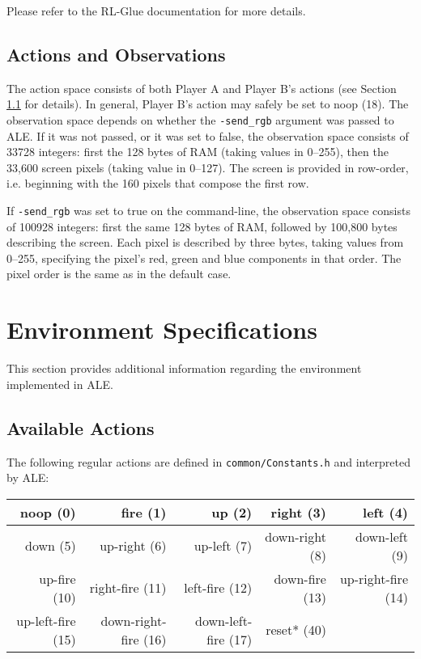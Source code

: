 \documentclass[12pt]{article}
\begin{document}
Please refer to the RL-Glue documentation for more details. 


\subsection{Actions and Observations}

The action space consists of both Player A and Player B's actions (see Section 
\ref{sec:available_actions}
for details). In general, Player B's action may safely be set to noop (18). The observation
space depends on whether the \verb+-send_rgb+ argument was passed to ALE. If it was not passed, 
or it was set to false, the observation space consists of 33728 integers: first the 128 bytes 
of RAM (taking values in 0--255), then the 33,600 screen pixels (taking value in 0--127). The 
screen is provided in row-order, i.e. beginning with the 160 pixels that compose the first row.

 If \verb+-send_rgb+ was set to true on the command-line, the observation space consists of 100928 
 integers: first the same 128 bytes of RAM, followed by 100,800 bytes describing the screen.
 Each pixel is described by three bytes, taking values from 0--255, specifying the pixel's 
 red, green and blue components in that order. The pixel order is the same as in the default
 case.

\section{Environment Specifications}\label{sec:environment_specifications}

This section provides additional information regarding the environment implemented in ALE.

\subsection{Available Actions}\label{sec:available_actions}

The following regular actions are defined in \verb+common/Constants.h+ and interpreted by ALE:

\begin{center}
\begin{tabular}{|r|r|r|r|r|}
\hline
noop (0) & fire (1) & up (2) & right (3) & left (4) \\
\hline
down (5) & up-right (6) & up-left (7) & down-right (8) & down-left (9) \\
\hline
up-fire (10) & right-fire (11) & left-fire (12) & down-fire (13) & up-right-fire (14) \\
\hline
up-left-fire (15) & down-right-fire (16) & down-left-fire (17) & reset* (40) & \\
\hline
\end{tabular}
\end{center}
\end{document}
